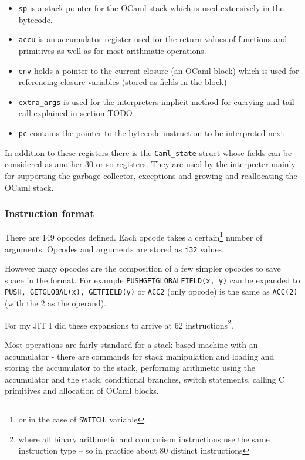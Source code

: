 \begin{itemize}
    \item \texttt{sp} is a stack pointer for the OCaml stack which is used extensively
          in the bytecode.
    \item \texttt{accu} is an accumulator register used for the return values of functions
          and primitives as well as for most arithmatic operations.
    \item \texttt{env} holds a pointer to the current closure (an OCaml block) which is used for
          referencing
          closure variables (stored as fields in the block)
    \item \texttt{extra\_args} is used for the interpreters implicit method for currying and
          tail-call explained in section TODO
    \item \texttt{pc} contains the pointer to the bytecode instruction to be interpreted next
\end{itemize}

In addition to these registers there is the \texttt{Caml\_state} struct whose fields can be
considered as another 30 or so registers. They are used by the interpreter mainly for supporting
the garbage collector, exceptions and growing and reallocating the OCaml stack.

\subsubsection{Instruction format}

There are 149 opcodes defined. Each opcode takes a certain\footnote{or in the case of
    \texttt{SWITCH}, variable} number of arguments. Opcodes and arguments are stored as
\texttt{i32}
values.

However many opcodes are the composition of a few simpler opcodes to save space in the
format. For example \texttt{PUSHGETGLOBALFIELD(x, y)} can be expanded to \texttt{PUSH,
    GETGLOBAL(x), GETFIELD(y)} or \texttt{ACC2} (only opcode) is the same as \texttt{ACC(2)} (with
the 2 as the operand).

For my JIT I did these expansions to arrive at 62 instructions\footnote{where all binary
    arithmetic and comparison instructions use the same instruction type -- so in practice about
    80 distinct instructions}.

Most operations are fairly standard for a stack based machine with an accumulator - there are
commands for stack manipulation and loading and storing the accumulator to the stack, performing
arithmetic using the accumulator and the stack,
conditional branches, switch statements, calling C primitives and allocation of OCaml blocks.

